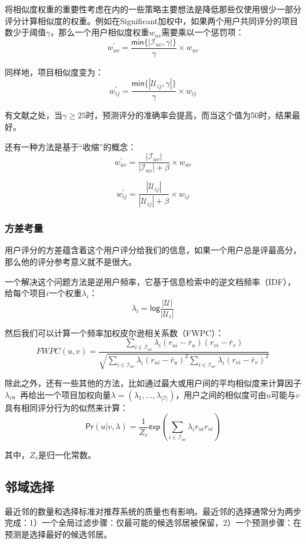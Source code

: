 \documentclass{article}
\begin{document}
 将相似度权重的重要性考虑在内的一些策略主要想法是降低那些仅使用很少一部分评分计算相似度的权重。例如在Significant加权中，如果两个用户共同评分的项目数少于阈值$\gamma$，那么一个用户相似度权重$w_{uv}$需要乘以一个惩罚项：
 $$ w_{uv}^{'}=\frac{\mathsf{min}\{|\mathcal{I}_{uv},\gamma|\}}{\gamma}\times w_{uv} $$

 同样地，项目相似度变为：
 $$ w_{ij}^{'}=\frac{\mathsf{min}\{|\mathcal{U}_{ij},\gamma|\}}{\gamma}\times w_{ij} $$

 有文献之处，当$\gamma\geq 25$时，预测评分的准确率会提高，而当这个值为50时，结果最好。

 还有一种方法是基于“收缩”的概念：
 $$ w_{uv}^{'}=\frac{|\mathcal{I}_{uv}|}{|\mathcal{I}_{uv}|+\beta}\times w_{uv} $$

 $$ w_{ij}^{'}=\frac{|\mathcal{U}_{ij}|}{|\mathcal{U}_{ij}|+\beta}\times w_{ij} $$ 

 \subsubsection{方差考量}
 用户评分的方差蕴含着这个用户评分给我们的信息，如果一个用户总是评最高分，那么他的评分参考意义就不是很大。

 一个解决这个问题方法是逆用户频率，它基于信息检索中的逆文档频率（IDF），给每个项目$i$一个权重$\lambda_{i}$：
 $$ \lambda_i=\mathsf{log}\frac{|\mathcal{U}|}{|\mathcal{U}_i|} $$

 然后我们可以计算一个频率加权皮尔逊相关系数（FWPC）：
 $$ FWPC(u,v)=\frac{\mathop{\sum}\limits_{i\in\mathcal{I}_{uv}}\lambda_i(r_{ui}-\bar{r}_{u})(r_{vi}-\bar{r}_{v})}{\sqrt{\mathop{\sum}\limits_{i\in\mathcal{I}_{uv}}\lambda_i(r_{ui}-\bar{r}_{u})^2\mathop{\sum}\limits_{i\in\mathcal{I}_{uv}}\lambda_i(r_{vi}-\bar{r}_{v})^2}} $$

 除此之外，还有一些其他的方法，比如通过最大或用户间的平均相似度来计算因子$\lambda_i$。再给出一个项目加权向量$\lambda=(\lambda_1,\dots,\lambda_{|\mathcal{I}|})$，用户之间的相似度可由$u$可能与$v$具有相同评分行为的似然来计算：
 $$ \mathsf{Pr}(u|v,\lambda)=\frac{1}{Z_{v}}\mathsf{exp}\left(\mathop{\sum}\limits_{i\in\mathcal{I}_{uv}}\lambda_ir_{ui}r_{vi}\right) $$

 其中，$Z_v$是归一化常数。

 \subsection{邻域选择}
 最近邻的数量和选择标准对推荐系统的质量也有影响。最近邻的选择通常分为两步完成：1）一个全局过滤步骤：仅最可能的候选邻居被保留，2）一个预测步骤：在预测是选择最好的候选邻居。
\end{document}
